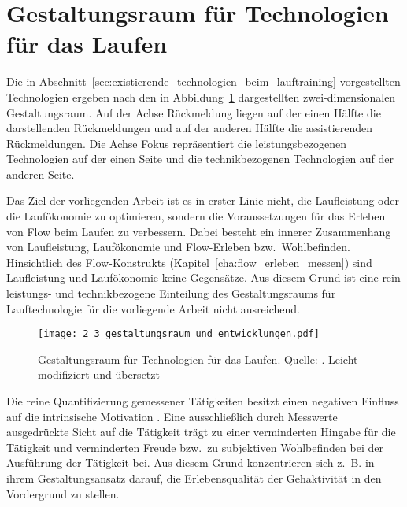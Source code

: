 \section{Gestaltungsraum für Technologien für das Laufen} 

\label{sec:gestaltungsraum_fur_technologien_fur_das_laufen}

Die in Abschnitt~\ref{sec:existierende_technologien_beim_lauftraining} vorgestellten Technologien ergeben nach \citet[][]{Jensen2014} den in Abbildung~\ref{fig:2_3_gestaltungsraum_und_entwicklungen} dargestellten zwei-dimensionalen Gestaltungsraum. Auf der Achse Rückmeldung liegen auf der einen Hälfte die darstellenden Rückmeldungen und auf der anderen Hälfte die assistierenden Rückmeldungen. Die Achse Fokus repräsentiert die leistungsbezogenen Technologien auf der einen Seite und die technikbezogenen Technologien auf der anderen Seite.

Das Ziel der vorliegenden Arbeit ist es in erster Linie nicht, die Laufleistung oder die Laufökonomie zu optimieren, sondern die Voraussetzungen für das Erleben von Flow beim Laufen zu verbessern. Dabei besteht ein innerer Zusammenhang von Laufleistung, Laufökonomie und Flow-Erleben bzw.\ Wohlbefinden. Hinsichtlich des Flow-Konstrukts (Kapitel~\ref{cha:flow_erleben_messen}) sind Laufleistung und Laufökonomie keine Gegensätze. Aus diesem Grund ist eine rein leistungs- und technikbezogene Einteilung des Gestaltungsraums für Lauftechnologie für die vorliegende Arbeit nicht ausreichend.

\begin{figure}
	[t] \centering 
	\texttt{[image: 2\_3\_gestaltungsraum\_und\_entwicklungen.pdf]} \caption[Gestaltungsraum für Technologien für das Laufen]{Gestaltungsraum für Technologien für das Laufen. Quelle: \citet[][]{Jensen2014}. Leicht modifiziert und übersetzt}\label{fig:2_3_gestaltungsraum_und_entwicklungen} 
\end{figure}

Die reine Quantifizierung gemessener Tätigkeiten besitzt einen negativen Einfluss auf die intrinsische Motivation \citep[][]{Etkin2016}. Eine ausschließlich durch Messwerte ausgedrückte Sicht auf die Tätigkeit trägt zu einer verminderten Hingabe für die Tätigkeit und verminderten Freude bzw.\ zu subjektiven Wohlbefinden bei der Ausführung der Tätigkeit bei. Aus diesem Grund konzentrieren sich z.~B. \citet{Hajinejad2015} in ihrem Gestaltungsansatz darauf, die Erlebensqualität der Gehaktivität in den Vordergrund zu stellen.

